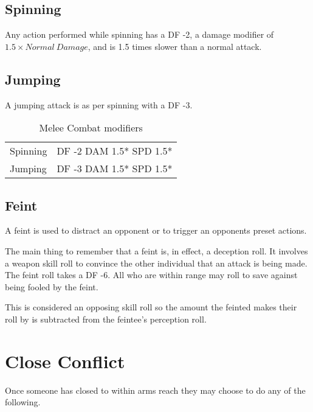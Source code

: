 
\subsection{Spinning}


Any action performed while spinning has a DF -2, a damage modifier
of \( 1.5 \times Normal\ Damage \), and is 1.5 times slower than a
normal attack.

\subsection{Jumping}


A jumping attack is as per spinning with a DF -3.

\begin{table}
	\begin{tabular}{ll}
	Spinning		 &		  DF -2 DAM 1.5* SPD 1.5* \\
	Jumping		&		  DF -3 DAM 1.5* SPD 1.5* \\
	\end{tabular}
    \caption{Melee Combat modifiers}
\end{table}

\subsection{Feint}

A feint is used to distract an opponent or to trigger an opponents
preset actions.

The main thing to remember that a feint is, in effect, a deception
roll. It involves a weapon skill roll to convince the other
individual that an attack is being made. The feint roll takes a DF
-6. All who are within range may roll to save against
being fooled by the feint.

This is considered an opposing skill roll so the amount the feinted makes
their roll by is subtracted from the feintee's perception roll.

\section{Close Conflict}

Once someone has closed to within arms reach they may choose to do
any of the following.

